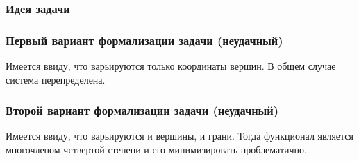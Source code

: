 \documentclass[a4paper,12pt, titlepage]{article}
\begin{document}
\subsubsection{Идея задачи}
\subsubsection{Первый вариант формализации задачи (неудачный)}
Имеется ввиду, что варьируются только координаты вершин. В общем случае система перепределена.
\subsubsection{Второй вариант формализации задачи (неудачный)}
Имеется ввиду, что варьируются и вершины, и грани. Тогда функционал является многочленом четвертой степени 
и его минимизировать проблематично.
\end{document}
